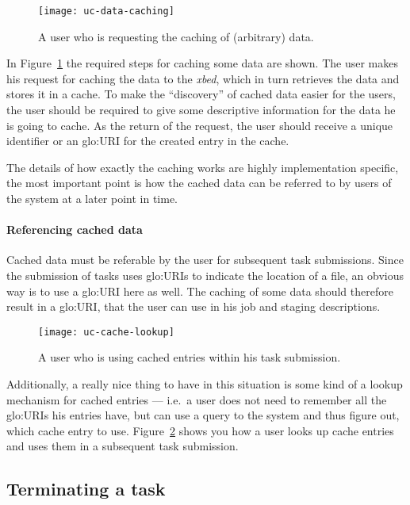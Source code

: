 \begin{figure}[h]
  \centering
  \texttt{[image: uc-data-caching]}
  \caption[UC  Data  Caching]{A user  who  is  requesting  the caching  of
    (arbitrary) data.}
  \label{fig:uc-data-caching}
\end{figure}

In  Figure~\ref{fig:uc-data-caching} the required  steps for  caching some
data are  shown. The user  makes his request  for caching the data  to the
\emph{xbed}, which in turn retrieves the data and stores it in a cache. To
make  the ``discovery''  of cached  data easier  for the  users,  the user
should be required to give some descriptive information for the data he is
going to  cache. As the return of  the request, the user  should receive a
unique identifier or an \gls{glo:URI} for the created entry in the cache.

The details  of how  exactly the caching  works are  highly implementation
specific, the most important point is  how the cached data can be referred
to by users of the system at a later point in time.

\paragraph{Referencing cached  data}

Cached data must be referable by the user for subsequent task submissions.
Since the submission of tasks uses \gls{glo:URI}s to indicate the location
of a  file, an obvious  way is  to use a  \gls{glo:URI} here as  well. The
caching of some data should  therefore result in a \gls{glo:URI}, that the
user can use in his job and staging descriptions.

\begin{figure}[h]
  \centering
  \texttt{[image: uc-cache-lookup]}
  \caption[UC  Cache Lookup]{A user  who  is using cached entries within
    his task submission.}
  \label{fig:uc-cache-lookup}
\end{figure}

Additionally, a really  nice thing to have in this  situation is some kind
of a lookup mechanism for cached  entries --- i.e.~a user does not need to
remember all the  \gls{glo:URI}s his entries have, but can  use a query to
the    system   and   thus    figure   out,    which   cache    entry   to
use. Figure~\ref{fig:uc-cache-lookup} shows you  how a user looks up cache
entries and uses them in a subsequent task submission.

\subsection{Terminating a task}
\label{sec:uc-terminate-task}

